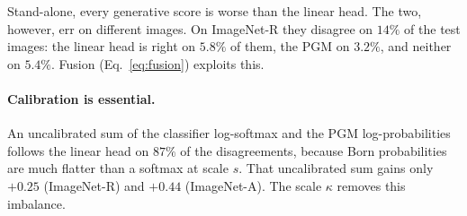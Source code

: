 Stand-alone, every generative score is worse than the linear head. The two,
however, err on different images. On ImageNet-R they disagree on $14\%$ of
the test images: the linear head is right on $5.8\%$ of them, the PGM on
$3.2\%$, and neither on $5.4\%$. Fusion (Eq.~\ref{eq:fusion}) exploits this.

\paragraph{Calibration is essential.}
An uncalibrated sum of the classifier log-softmax and the PGM
log-probabilities follows the linear head on $87\%$ of the disagreements,
because Born probabilities are much flatter than a softmax at scale $s$.
That uncalibrated sum gains only $+0.25$ (ImageNet-R) and $+0.44$
(ImageNet-A). The scale $\kappa$ removes this imbalance.

